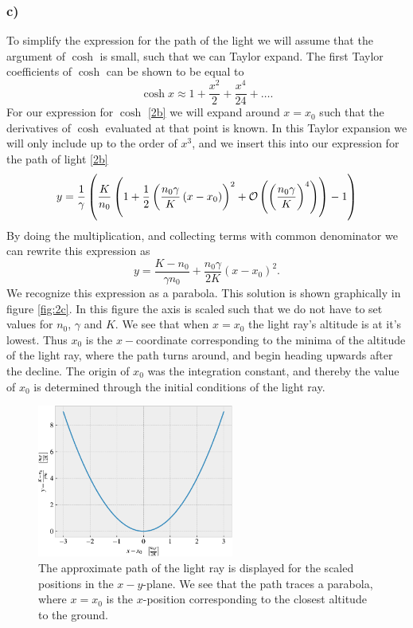 \documentclass[12pt,twoside]{article}
\DeclareRobustCommand{\bigO}{%
  \text{\usefont{OMS}{cmsy}{m}{n}O}%
}
\begin{document}
\subsubsection*{c)}
To simplify the expression for the path of the light we will assume that the argument of $\cosh{}$ is small, such that we can Taylor expand. The first Taylor coefficients of $\cosh{}$ can be shown \cite{Rottmann} to be equal to
\begin{equation}
  \cosh{x}\approx1+\frac{x^2}{2} + \frac{x^4}{24} + \ldots.
\end{equation}
For our expression for $\cosh{}$ \eqref{2b} we will expand around $x=x_0$ such that the derivatives of $\cosh{}$ evaluated at that point is known. In this Taylor expansion we will only include up to the order of $x^3$, and we insert this into our expression for the path of light \eqref{2b}
\begin{equation}
   y = \frac{1}{\gamma}\left(\frac{K}{n_0}\left(1+\frac{1}{2}\left(\frac{n_0\gamma}{K}\left(x-x_0\right)\right)^2 + \bigO\left(\left(\frac{n_0\gamma}{K}\right)^4\right) \right)-1\right)
\end{equation}
By doing the multiplication, and collecting terms with common denominator we can rewrite this expression as
\begin{equation}
   y = \frac{K-n_0}{\gamma n_0} + \frac{n_0\gamma}{2K}\left(x-x_0\right)^2.
\end{equation}
We recognize this expression as a parabola. This solution is shown graphically in figure \vref{fig:2c}. In this figure the axis is scaled such that we do not have to set values for $n_0$, $\gamma$ and $K$. We see that when $x=x_0$ the light ray's altitude is at it's lowest. Thus $x_0$ is the $x-$coordinate corresponding to the minima of the altitude of the light ray, where the path turns around, and begin heading upwards after the decline. The origin of $x_0$ was the integration constant, and thereby the value of $x_0$ is determined through the initial conditions of the light ray.
\begin{figure}[h!]
  \centering
  \includegraphics[width=0.575\textwidth]{../figures/2c.pdf}
  \caption{The approximate path of the light ray is displayed for the scaled positions in the $x-y$-plane. We see that the path traces a parabola, where $x=x_0$ is the $x$-position corresponding to the closest altitude to the ground.}
  \label{fig:2c}
\end{figure}
\end{document}
